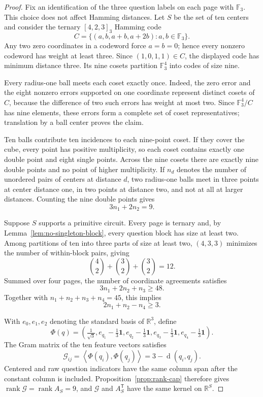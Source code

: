 \documentclass[10pt,a4paper]{amsart}
\newcommand{\F}{\mathbb{F}}
\newcommand{\R}{\mathbb{R}}
\newcommand{\dist}{\operatorname{d}}
\newcommand{\inner}[2]{\left\langle #1,#2\right\rangle}
\newcommand{\one}{\mathbf{1}}
\newcommand{\rank}{\operatorname{rank}}
\begin{document}
\begin{proof}
Fix an identification of the three question labels on each page with
\(\F_3\).  This choice does not affect Hamming distances.  Let \(S\) be the
set of ten centers and consider the ternary \([4,2,3]_3\)
Hamming code
\[
  C=\{(a,b,a+b,a+2b):a,b\in\F_3\}.
\]
Any two zero coordinates in a codeword force \(a=b=0\); hence every nonzero
codeword has weight at least three.  Since \((1,0,1,1)\in C\), the displayed
code has minimum distance three.  Its nine cosets partition \(\F_3^4\) into
codes of size nine.

Every radius-one ball meets each coset exactly once.  Indeed, the zero error
and the eight nonzero errors supported on one coordinate represent distinct
cosets of \(C\), because the difference of two such errors has weight at most
two.  Since \(\F_3^4/C\) has nine elements, these errors form a complete set
of coset representatives; translation by a ball center proves the claim.

Ten balls contribute ten incidences to each nine-point coset.  If they cover
the cube, every point has positive multiplicity, so each coset contains
exactly one double point and eight single points.  Across the nine cosets
there are exactly nine double points and no point of higher multiplicity.  If
\(n_d\) denotes the number of unordered pairs of centers at distance \(d\),
two radius-one balls meet in three points at center distance one, in two
points at distance two, and not at all at larger distances.  Counting the
nine double points gives
\begin{equation}\label{eq:intersection-app}
  3n_1+2n_2=9.
\end{equation}

Suppose \(S\) supports a primitive circuit.  Every page is ternary and,
by Lemma~\ref{lem:no-singleton-block}, every question block has size at least
two.  Among partitions of ten into three parts of size at least two,
\((4,3,3)\) minimizes the number of within-block pairs, giving
\[
  \binom42+\binom32+\binom32=12.
\]
Summed over four pages, the number of coordinate agreements satisfies
\[
  3n_1+2n_2+n_3
  \geq48.
\]
Together with \(n_1+n_2+n_3+n_4=45\), this implies
\[
  2n_1+n_2-n_4
  \geq3.
\]

With \(e_0,e_1,e_2\) denoting the standard basis of \(\R^3\), define
\[
  \Phi(q)=
  \left(
  \tfrac1{\sqrt3},
  e_{q_1}-\tfrac13\one,
  e_{q_2}-\tfrac13\one,
  e_{q_3}-\tfrac13\one,
  e_{q_4}-\tfrac13\one
  \right).
\]
The Gram matrix of the ten feature vectors satisfies
\[
  \mathcal G_{ij}
  =
  \inner{\Phi(q_i)}{\Phi(q_j)}
  =
  3-\dist(q_i,q_j).
\]
Centered and raw question indicators have the same column span after the
constant column is included.  Proposition~\ref{prop:rank-cap} therefore gives
\(\rank \mathcal G=\rank A_S=9\), and \(\mathcal G\) and
\(A_S^{\mathsf T}\) have the same
kernel on \(\R^S\).


\end{proof}
\end{document}
